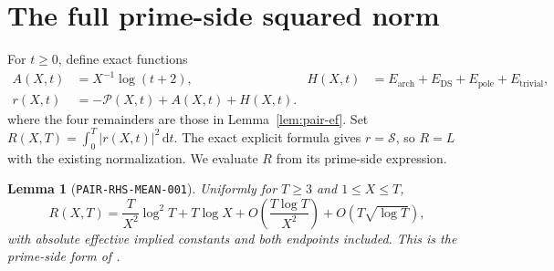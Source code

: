 \documentclass[11pt]{article}
\newtheorem{lemma}{Lemma}
\newcommand{\dd}{\,\mathrm d}
\newcommand{\ZS}{\mathcal S}
\newcommand{\PS}{\mathcal P}
\newcommand{\EP}{E_{\mathrm{pole}}}
\newcommand{\ET}{E_{\mathrm{trivial}}}
\newcommand{\EA}{E_{\mathrm{arch}}}
\newcommand{\ED}{E_{\mathrm{DS}}}
\begin{document}
\section{The full prime-side squared norm}

For \(t\geq0\), define exact functions
\begin{align*}
 A(X,t)&=X^{-1}\log(t+2),&
 H(X,t)&=\EA+\ED+\EP+\ET,\\
 r(X,t)&=-\PS(X,t)+A(X,t)+H(X,t).
\end{align*}
where the four remainders are those in Lemma~\ref{lem:pair-ef}.
Set \(R(X,T)=\int_0^T|r(X,t)|^2\dd t\).
The exact explicit formula gives \(r=\ZS\), so \(R=L\) with
the existing normalization. We evaluate \(R\) from its prime-side
expression.

\begin{lemma}[\texttt{PAIR-RHS-MEAN-001}]\label{lem:rhs-mean}
Uniformly for \(T\geq3\) and \(1\leq X\leq T\),
\begin{equation}\label{eq:rhs-mean}
 R(X,T)=\frac{T}{X^2}\log^2T+T\log X
       +O\left(\frac{T\log T}{X^2}\right)
       +O(T\sqrt{\log T}),
\end{equation}
with absolute effective implied constants and both endpoints included.
This is the prime-side form of \cite[(2.19)]{BGSTB2024}.
\end{lemma}
\end{document}
